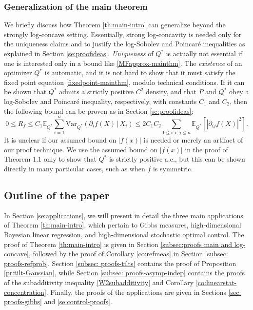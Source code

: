 \documentclass[11pt,reqno]{amsart}
\numberwithin{equation}{section}
\theoremstyle{definition}
\def\E{{\mathbb E}}
\def\Var{{\mathrm{Var}}}
\begin{document}
\subsubsection{Generalization of the main theorem}\label{sec: generalization}

We briefly discuss how Theorem \ref{th:main-intro} can generalize beyond the strongly log-concave setting.
Essentially, strong log-concavity is needed only for the uniqueness claims and to justify the log-Sobolev and Poincar\'e inequalities as explained in Section \ref{se:proofideas}.
\emph{Uniqueness} of $Q^*$ is actually not essential if one is interested only in a bound like \eqref{MFapprox-mainthm}.
The \emph{existence} of an optimizer $Q^*$ is automatic, and it is not hard to show that it must satisfy the fixed point equation \eqref{fixedpoint-mainthm}, modulo technical conditions.
If it can be shown that $Q^*$ admits a strictly positive $C^2$ density, and that $P$ and $Q^*$ obey a log-Sobolev and Poincar\'e inequality, respectively, with constants $C_1$ and $C_2$, then the following bound can be proven as in Section \ref{se:proofideas}:
\begin{equation*}
0 \le R_f \le C_1 \E_{Q^*}\sum_{i=1}^n  \Var_{Q^*}(\partial_i f(X)\,|\,X_i)  \le 2C_1C_2\sum_{1\le i<j\le n} \E_{Q^*}[|\partial_{ij}f(X)|^2]. 
\end{equation*}
It is unclear if our assumed bound on $|f(x)|$ is needed or merely an artifact of our proof technique. We use the assumed bound on $|f(x)|$ in the proof of Theorem 1.1 only to show that $Q^*$ is strictly positive a.e., but this can be shown directly in many particular cases, such as when $f$ is symmetric.

\subsection{Outline of the paper}


In Section \ref{se:applications}, we will present in detail the three main applications of Theorem \ref{th:main-intro}, which pertain to Gibbs measures, high-dimensional Bayesian linear regression, and high-dimensional stochastic optimal control. The proof of Theorem \ref{th:main-intro}  is given in Section \ref{subsec:proofs main and log-concave}, followed by the proof of Corollary \ref{co:refmeas} in Section \ref{subsec: proofs-refprob}. Section \ref{subsec: proofs-tilts} contains the proof of Proposition \ref{pr:tilt-Gaussian}, while Section \ref{subsec: proofs-asymp-indep} contains the proofs of the subadditivity inequality  \eqref{W2subadditivity} and Corollary \ref{co:linearstat-concentration}. Finally, the proofs of the applications are given in Sections \ref{sec: proofs-gibbs} and \ref{se:control-proofs}.
\end{document}
